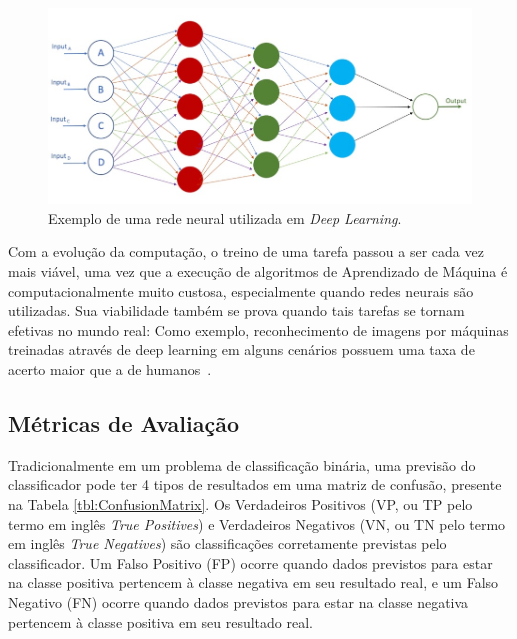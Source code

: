 \documentclass[portugues]{ic-tese}
\begin{document}
\begin{figure}[h]
\centering
\includegraphics[scale=0.8]{images/deep_neural_network.jpg}
\caption {Exemplo de uma rede neural utilizada em \textit{Deep Learning}.}
\label{fig:NeuralNetwork}
\end{figure}

Com a evolução da computação, o treino de uma tarefa passou a ser cada vez mais viável, uma vez que a execução de algoritmos de Aprendizado de Máquina é computacionalmente muito custosa, especialmente quando redes neurais são utilizadas. Sua viabilidade também se prova quando tais tarefas se tornam efetivas no mundo real: Como exemplo, reconhecimento de imagens por máquinas treinadas através de deep learning em alguns cenários possuem uma taxa de acerto maior que a de humanos~\citep{Copeland_2016}.

\subsection{Métricas de Avaliação}
\label{sec:EvaluationMetrics}

Tradicionalmente em um problema de classificação binária, uma previsão do classificador pode ter 4 tipos de resultados em uma matriz de confusão, presente na Tabela \ref{tbl:ConfusionMatrix}. Os Verdadeiros Positivos (VP, ou TP pelo termo em inglês \textit{True Positives}) e Verdadeiros Negativos (VN, ou TN pelo termo em inglês \textit{True Negatives}) são classificações corretamente previstas pelo classificador. Um Falso Positivo (FP) ocorre quando dados previstos para estar na classe positiva pertencem à classe negativa em seu resultado real, e um Falso Negativo (FN) ocorre quando dados previstos para estar na classe negativa pertencem à classe positiva em seu resultado real.
\end{document}
